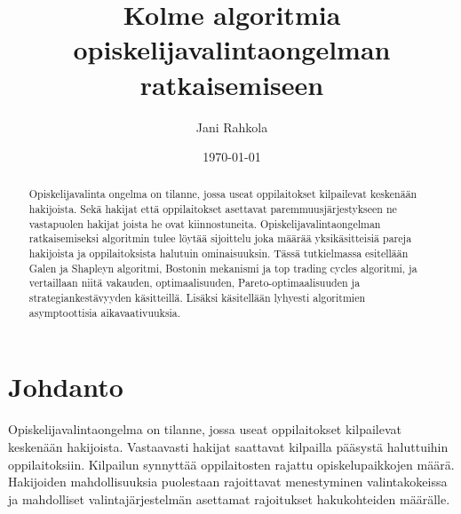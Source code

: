 \documentclass[gradu, twoside]{tktltiki}
\begin{document}
\title{Kolme algoritmia opiskelijavalintaongelman ratkaisemiseen}
\author{Jani Rahkola}
\date{\today}



\maketitle

\doublespacing

\subject{Tietojenkäsittelytiede}

\def\hyph{-\penalty0\hskip0pt\relax}
\hyphenation{}

\begin{abstract}
Opiskelijavalinta ongelma on tilanne, jossa useat oppilaitokset
kilpailevat keskenään hakijoista. Sekä hakijat että oppilaitokset
asettavat paremmuusjärjestykseen ne vastapuolen hakijat joista he ovat
kiinnostuneita. Opiskelijavalintaongelman ratkaisemiseksi algoritmin
tulee löytää sijoittelu joka määrää yksikäsitteisiä pareja hakijoista
ja oppilaitoksista halutuin ominaisuuksin. Tässä tutkielmassa
esitellään Galen ja Shapleyn algoritmi, Bostonin mekanismi ja top
trading cycles algoritmi, ja vertaillaan niitä vakauden,
optimaalisuuden, Pareto\hyph optimaalisuuden ja strategiankestävyyden
käsitteillä. Lisäksi käsitellään lyhyesti algoritmien asymptoottisia
aikavaativuuksia.
\end{abstract}

\mytableofcontents

\section{Johdanto}

Opiskelijavalintaongelma on tilanne, jossa useat oppilaitokset
kilpailevat keskenään hakijoista. Vastaavasti hakijat saattavat
kilpailla pääsystä haluttuihin oppilaitoksiin. Kilpailun synnyttää
oppilaitosten rajattu opiskelupaikkojen määrä. Hakijoiden
mahdollisuuksia puolestaan rajoittavat menestyminen valintakokeissa ja
mahdolliset valintajärjestelmän asettamat rajoitukset hakukohteiden
määrälle.
\end{document}
